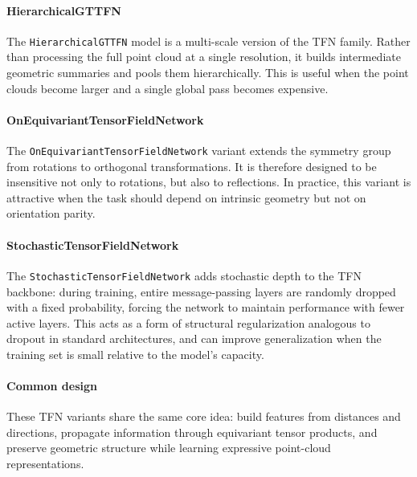 \documentclass[a4paper,11pt]{article}
\begin{document}
\paragraph{HierarchicalGTTFN}
The \texttt{HierarchicalGTTFN} model is a multi-scale version of the TFN family.
Rather than processing the full point cloud at a single resolution, it builds intermediate geometric summaries and pools them hierarchically.
This is useful when the point clouds become larger and a single global pass becomes expensive.

\paragraph{OnEquivariantTensorFieldNetwork}
The \texttt{OnEquivariantTensorFieldNetwork} variant extends the symmetry group from rotations to orthogonal transformations.
It is therefore designed to be insensitive not only to rotations, but also to reflections.
In practice, this variant is attractive when the task should depend on intrinsic geometry but not on orientation parity.

\paragraph{StochasticTensorFieldNetwork}
The \texttt{StochasticTensorFieldNetwork} adds stochastic depth to the TFN backbone: during training, entire message-passing layers are randomly dropped with a fixed probability, forcing the network to maintain performance with fewer active layers.
This acts as a form of structural regularization analogous to dropout in standard architectures, and can improve generalization when the training set is small relative to the model's capacity.

\paragraph{Common design}
These TFN variants share the same core idea: build features from distances and directions, propagate information through equivariant tensor products, and preserve geometric structure while learning expressive point-cloud representations.
\end{document}

